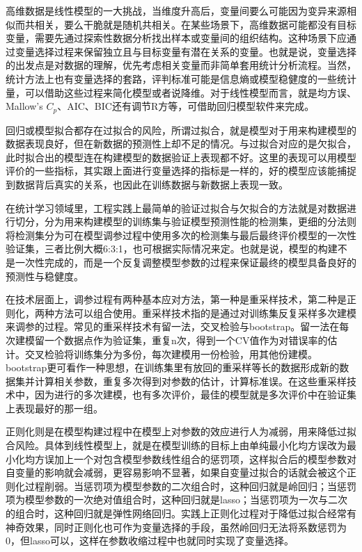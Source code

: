 \documentclass[]{tufte-book}
\begin{document}
高维数据是线性模型的一大挑战，当维度升高后，变量间要么可能因为变异来源相似而共相关，要么干脆就是随机共相关。在某些场景下，高维数据可能都没有目标变量，需要先通过探索性数据分析找出样本或变量间的组织结构。这种场景下应通过变量选择过程来保留独立且与目标变量有潜在关系的变量。也就是说，变量选择的出发点是对数据的理解，优先考虑相关变量而非简单套用统计分析流程。当然，统计方法上也有变量选择的套路，评判标准可能是信息熵或模型稳健度的一些统计量，可以借助这些过程来简化模型或者说降维。对于线性模型而言，就是均方误、Mallow's \(C_p\)、AIC、BIC还有调节R方等，可借助回归模型软件来完成。

回归或模型拟合都存在过拟合的风险，所谓过拟合，就是模型对于用来构建模型的数据表现良好，但在新数据的预测性上却不足的情况。与过拟合对应的是欠拟合，此时拟合出的模型连在构建模型的数据验证上表现都不好。这里的表现可以用模型评价的一些指标，其实跟上面进行变量选择的指标是一样的，好的模型应该能捕捉到数据背后真实的关系，也因此在训练数据与新数据上表现一致。

在统计学习领域里，工程实践上最简单的验证过拟合与欠拟合的方法就是对数据进行切分，分为用来构建模型的训练集与验证模型预测性能的检测集，更细的分法则将检测集分为可在模型调参过程中使用多次的检测集与最后最终评价模型的一次性验证集，三者比例大概6:3:1，也可根据实际情况来定。也就是说，模型的构建不是一次性完成的，而是一个反复调整模型参数的过程来保证最终的模型具备良好的预测性与稳健度。

在技术层面上，调参过程有两种基本应对方法，第一种是重采样技术，第二种是正则化，两种方法可以组合使用。重采样技术指的是通过对训练集反复采样多次建模来调参的过程。常见的重采样技术有留一法，交叉检验与bootstrap。留一法在每次建模留一个数据点作为验证集，重复n次，得到一个CV值作为对错误率的估计。交叉检验将训练集分为多份，每次建模用一份检验，用其他份建模。bootstrap更可看作一种思想，在训练集里有放回的重采样等长的数据形成新的数据集并计算相关参数，重复多次得到对参数的估计，计算标准误。在这些重采样技术中，因为进行的多次建模，也有多次评价，最佳的模型就是多次评价中在验证集上表现最好的那一组。

正则化则是在模型构建过程中在模型上对参数的效应进行人为减弱，用来降低过拟合风险。具体到线性模型上，就是在模型训练的目标上由单纯最小化均方误改为最小化均方误加上一个对包含模型参数线性组合的惩罚项，这样拟合后的模型参数对自变量的影响就会减弱，更容易影响不显著，如果自变量过拟合的话就会被这个正则化过程削弱。当惩罚项为模型参数的二次组合时，这种回归就是岭回归；当惩罚项为模型参数的一次绝对值组合时，这种回归就是lasso；当惩罚项为一次与二次的组合时，这种回归就是弹性网络回归。实践上正则化过程对于降低过拟合经常有神奇效果，同时正则化也可作为变量选择的手段，虽然岭回归无法将系数惩罚为0，但lasso可以，这样在参数收缩过程中也就同时实现了变量选择。
\end{document}
